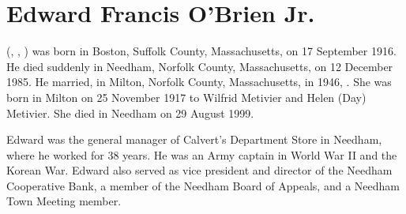 \section{Edward Francis O'Brien Jr.}\label{per:Edward4OBrien3}

 (, , ) was born in Boston, Suffolk County, Massachusetts, on 17 September 1916.\cite{Edward4OBrien3Birth} He died suddenly in Needham, Norfolk County, Massachusetts, on 12 December 1985.\cite{Edward4OBrien3Death} He married, in Milton, Norfolk County, Massachusetts, in 1946, .\cite{Edward4OBrien3Marriage} She was born in Milton on 25 November 1917 to Wilfrid Metivier and Helen (Day) Metivier.\cite{MaryMetivierBirth} She died in Needham on 29 August 1999.\cite{MaryMetivierDeath}

Edward was the general manager of Calvert's Department Store in Needham, where he worked for 38 years. He was an Army captain in World War II and the Korean War. Edward also served as vice president and director of the Needham Cooperative Bank, a member of the Needham Board of Appeals, and a Needham Town Meeting member.\cite{Edward4OBrien3Obit:2}


